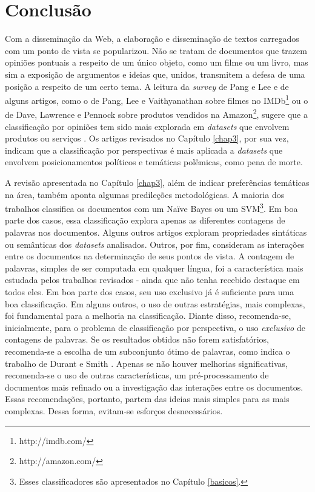 \chapter{Conclusão}
\label{conclusoes}

Com a disseminação da Web, a elaboração e disseminação de textos carregados com um ponto de vista se popularizou. Não se tratam de documentos que trazem opiniões pontuais a respeito de um único objeto, como um filme ou um livro, mas sim a exposição de argumentos e ideias que, unidos, transmitem a defesa de uma posição a respeito de um certo tema. A leitura da \emph{survey} de Pang e Lee e de alguns artigos, como o de Pang, Lee e Vaithyanathan sobre filmes no IMDb\footnote{http://imdb.com/} ou o de Dave, Lawrence e Pennock sobre produtos vendidos na Amazon\footnote{http://amazon.com/}, sugere que a classificação por opiniões tem sido mais explorada em \emph{datasets} que envolvem produtos ou serviços \cite{omsa} \cite{thumbs-up} \cite{peanut-gallery}. Os artigos revisados no Capítulo \ref{chap3}, por sua vez, indicam que a classificação por perspectivas é mais aplicada a \emph{datasets} que envolvem posicionamentos políticos e temáticas polêmicas, como pena de morte.

A revisão apresentada no Capítulo \ref{chap3}, além de indicar preferências temáticas na área, também aponta algumas predileções metodológicas. A maioria dos trabalhos classifica os documentos com um Naïve Bayes ou um SVM\footnote{Esses classificadores são apresentados no Capítulo \ref{basicos}.}. Em boa parte dos casos, essa classificação explora apenas as diferentes contagens de palavras nos documentos. Alguns outros artigos exploram propriedades sintáticas ou semânticas dos \emph{datasets} analisados. Outros, por fim, consideram as interações entre os documentos na determinação de seus pontos de vista. A contagem de palavras, simples de ser computada em qualquer língua, foi a característica mais estudada pelos trabalhos revisados - ainda que não tenha recebido destaque em todos eles. Em boa parte dos casos, seu uso exclusivo já é suficiente para uma boa classificação. Em alguns outros, o uso de outras estratégias, mais complexas, foi fundamental para a melhoria na classificação. Diante disso, recomenda-se, inicialmente, para o problema de classificação por perspectiva, o uso \emph{exclusivo} de contagens de palavras. Se os resultados obtidos não forem satisfatórios, recomenda-se a escolha de um subconjunto ótimo de palavras, como indica o trabalho de Durant e Smith \cite{durant-smith}. Apenas se não houver melhorias significativas, recomenda-se o uso de outras características, um pré-processamento de documentos mais refinado ou a investigação das interações entre os documentos. Essas recomendações, portanto, partem das ideias mais simples para as mais complexas. Dessa forma, evitam-se esforços desnecessários. 

